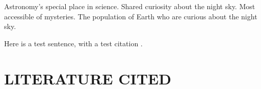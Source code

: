 \documentclass{ar2e}
\begin{document}
Astronomy's special place in science. Shared curiosity about the night sky. Most
accessible of mysteries. The population of Earth who
are curious about the night sky. 

Here is a test sentence, with a test citation \citep{Lin++08}.

\section{LITERATURE CITED}





\end{document}
